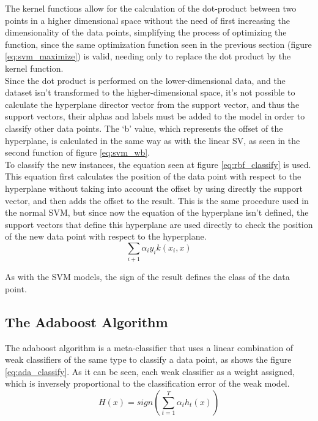 \documentclass[10pt, journal]{IEEEtran}
\begin{document}
The kernel functions allow for the calculation of the dot-product between two points in a higher dimensional space without the need of first increasing the dimensionality of the data points, simplifying the process of optimizing the function, since the same optimization function seen in the previous section (figure \ref{eq:svm_maximize}) is valid, needing only to replace the dot product by the kernel function.\\

Since the dot product is performed on the lower-dimensional data, and the dataset isn't transformed to the higher-dimensional space, it's not possible to calculate the hyperplane director vector from the support vector, and thus the support vectors, their alphas and labels must be added to the model in order to classify other data points. The `b' value, which represents the offset of the hyperplane, is calculated in the same way as with the linear SV, as seen in the second function of figure \ref{eq:svm_wb}.\\

To classify the new instances, the equation seen at figure \ref{eq:rbf_classify} is used. This equation first calculates the position of the data point with respect to the hyperplane without taking into account the offset by using directly the support vector, and then adds the offset to the result. This is the same procedure used in the normal SVM, but since now the equation of the hyperplane isn’t defined, the support vectors that define this hyperplane are used directly to check the position of the new data point with respect to the hyperplane.\\

\begin{equation}
	\sum_{i+1}{\alpha_{i}y_i k(x_i,x)}
	\label{eq:rbf_classify}
\end{equation}

As with the SVM models, the sign of the result defines the class of the data point.

\subsection{The Adaboost Algorithm} %
\label{sub:the_adaboost_algorithm}
The adaboost algorithm is a meta-classifier that uses a linear combination of weak classifiers of the same type to classify a data point, as shows the figure \ref{eq:ada_classify}. As it can be seen, each weak classifier as a weight assigned, which is inversely proportional to the classification error of the weak model.\\
\begin{equation}
	H(x) = sign(\sum_{t=1}^{T}{\alpha_t h_t(x)})
	\label{eq:ada_classify}
\end{equation}
\end{document}
